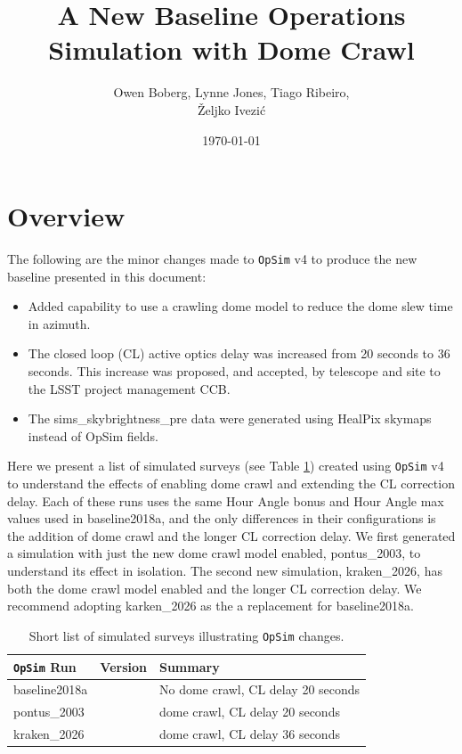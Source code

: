 \documentclass[DM,lsstdraft,authoryear,toc]{lsstdoc}
\title{A New Baseline Operations Simulation with Dome Crawl}
\author{%
Owen Boberg,
Lynne Jones,
Tiago Ribeiro, \\
\v{Z}eljko Ivezi\'{c}}
\date{\today}
\newcommand{\opsim}{\texttt{OpSim}\xspace}
\begin{document}
\maketitle

\section{Overview}

The following are the minor changes made to \opsim v4 to produce the new baseline presented in this document:

\begin{itemize}
\item Added capability to use a crawling dome model to reduce the dome slew time in azimuth.
\item The closed loop (CL) active optics delay was increased from 20 seconds to 36 seconds.
This increase was proposed, and accepted, by telescope and site to the LSST project management CCB.
\item The sims\_skybrightness\_pre data were generated using HealPix skymaps instead of OpSim fields.
\end{itemize}

Here we present a list of simulated surveys (see Table \ref{tab:runlist}) created using \opsim v4 to understand
the effects of enabling dome crawl and extending the CL correction delay. Each of these runs uses the same Hour
Angle bonus and Hour Angle max values used in baseline2018a, and the only differences in their configurations is the
addition of dome crawl and the longer CL correction delay. We first generated a simulation with just the new dome crawl model
enabled, pontus\_2003, to understand its effect in isolation. The second new simulation, kraken\_2026, has both the 
dome crawl model enabled and the longer CL correction delay. We recommend adopting karken\_2026 as the a replacement
for baseline2018a.

\begin{table}[htp]
\caption{Short list of simulated surveys illustrating \opsim changes.}
\begin{center}
\begin{tabular}{ l | l | l }
\toprule
\opsim Run & Version & Summary \\
\midrule
baseline2018a &   &  No dome crawl, CL delay 20 seconds\\
pontus\_2003  &   &  dome crawl, CL delay 20 seconds\\
kraken\_2026  &   &  dome crawl, CL delay 36 seconds\\  
\bottomrule
\end{tabular}
\end{center}
\label{tab:runlist}
\end{table}
\end{document}
